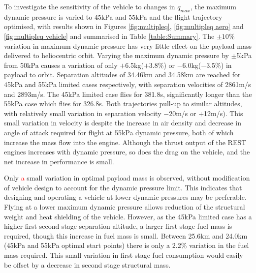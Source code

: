 \documentclass[journal]{new-aiaa}
\newcommand{\FirstStageAltFortyFive}{25.6}
\newcommand{\FirstStageAltFiftyFive}{24.0}
\newcommand{\FirstStagemincrease}{2.2}
\newcommand{\qVariationPluskg}{$+$6.5kg}
\newcommand{\qVariationMinuskg}{$-$6.0kg}
\newcommand{\qVariationPlus}{$+$3.8\%}
\newcommand{\qVariationMinus}{$-$3.5\%}
\newcommand{\vVariationPlus}{$+$12}
\newcommand{\vVariationMinus}{$-$20}
\newcommand{\SeparationAltFortyFivekPa}{34.46}
\newcommand{\SeparationAltFiftyFivekPa}{34.58}
\newcommand{\SeparationvFortyFivekPa}{2861}
\newcommand{\SeparationvFiftyFivekPa}{2893}
\newcommand{\FlightTimeFortyFivekPa}{381.8}
\newcommand{\FlightTimeFiftyFivekPa}{326.8}
\begin{document}
To investigate the sensitivity of the vehicle to changes in $q_{max}$, the maximum dynamic pressure is varied to 45kPa and 55kPa and the flight trajectory optimised, with results shown in Figures \ref{fig:multipleq}, \ref{fig:multipleq aero} and \ref{fig:multipleq vehicle} and summarised in Table \ref{table:Summary}.
The $\pm10\%$ variation in maximum dynamic pressure has very little effect on the payload mass delivered to heliocentric orbit.  Varying the maximum dynamic pressure by $\pm$5kPa from 50kPa causes a variation of only  \qVariationPluskg (\qVariationPlus) or \qVariationMinuskg (\qVariationMinus) in payload to orbit.  
 Separation altitudes of \SeparationAltFortyFivekPa km and \SeparationAltFiftyFivekPa km are reached  for 45kPa and 55kPa limited cases respectively, with separation velocities of \SeparationvFortyFivekPa m/s and \SeparationvFiftyFivekPa m/s. The 45kPa limited case flies for \FlightTimeFortyFivekPa s, significantly longer than the 55kPa case which flies for \FlightTimeFiftyFivekPa s.
 Both trajectories pull-up to similar altitudes, with relatively small variation in separation velocity \vVariationMinus m/s or \vVariationPlus m/s).
  This small variation in velocity is despite the increase in air density and decrease in angle of attack required for flight at 55kPa dynamic pressure, both of which increase the mass flow into the engine. Although the thrust output of the REST engines increases with dynamic pressure, so does the drag on the vehicle, and the net increase in performance is small. 


Only \textcolor{red}{a} small variation in optimal payload mass is observed, without modification of vehicle design to account for the dynamic pressure limit. This indicates that designing and operating a vehicle at lower dynamic pressures may be preferable. Flying at a lower maximum dynamic pressure allows reduction of the structural weight and heat shielding of the vehicle. However, as the 45kPa limited case has a higher first-second stage separation altitude, a larger first stage fuel mass is required, though this increase in fuel mass is small. Between \FirstStageAltFortyFive km  and \FirstStageAltFiftyFive km (45kPa and 55kPa optimal start points) there is only a \FirstStagemincrease \% variation in the fuel mass required. This small variation in first stage fuel consumption would easily be offset by a decrease in second stage structural mass. 
\end{document}
